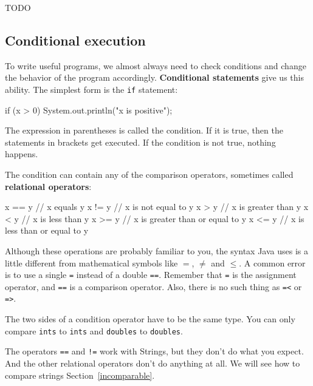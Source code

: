 TODO

\subsection{Conditional execution}


To write useful programs, we almost always need to check conditions and change the behavior of the program accordingly.
{\bf Conditional statements} give us this ability.
The simplest form is the {\tt if} statement:

\begin{code}
    if (x > 0) {
        System.out.println("x is positive");
    }
\end{code}

The expression in parentheses is called the condition.
If it is true, then the statements in brackets get executed.
If the condition is not true, nothing happens.


The condition can contain any of the comparison operators, sometimes called {\bf relational operators}:

\begin{code}
    x == y               // x equals y
    x != y               // x is not equal to y
    x > y                // x is greater than y
    x < y                // x is less than y
    x >= y               // x is greater than or equal to y
    x <= y               // x is less than or equal to y
\end{code}

Although these operations are probably familiar to you, the syntax Java uses is a little different from mathematical symbols like $=$, $\neq$ and $\le$.
A common error is to use a single {\tt =} instead of a double {\tt ==}.
Remember that {\tt =} is the assignment operator, and {\tt ==} is a comparison operator.
Also, there is no such thing as {\tt =<} or {\tt =>}.

The two sides of a condition operator have to be the same type.
You can only compare {\tt ints} to {\tt ints} and {\tt doubles} to {\tt doubles}.

The operators {\tt ==} and {\tt !=} work with Strings, but they don't do what you expect.
And the other relational operators don't do anything at all.
We will see how to compare strings Section~\ref{incomparable}.

